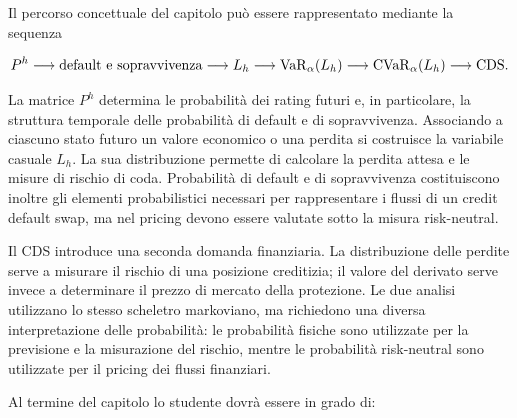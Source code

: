 Il percorso concettuale del capitolo pu\`{o} essere rappresentato
mediante la sequenza

\[
P^h
\longrightarrow
\text{default e sopravvivenza}
\longrightarrow
L_h
\longrightarrow
\operatorname{VaR}_{\alpha}(L_h)
\longrightarrow
\operatorname{CVaR}_{\alpha}(L_h)
\longrightarrow
\text{CDS}.
\]

La matrice $P^h$ determina le probabilit\`{a} dei rating futuri e,
in particolare, la struttura temporale delle probabilit\`{a} di
default e di sopravvivenza. Associando a ciascuno stato futuro un
valore economico o una perdita si costruisce la variabile casuale
$L_h$. La sua distribuzione permette di calcolare la perdita attesa
e le misure di rischio di coda. Probabilit\`{a} di default e di
sopravvivenza costituiscono inoltre gli elementi probabilistici
necessari per rappresentare i flussi di un credit default swap,
ma nel pricing devono essere valutate sotto la misura risk-neutral.

Il CDS introduce una seconda domanda finanziaria. La distribuzione
delle perdite serve a misurare il rischio di una posizione creditizia;
il valore del derivato serve invece a determinare il prezzo di mercato
della protezione. Le due analisi utilizzano lo stesso scheletro
markoviano, ma richiedono una diversa interpretazione delle
probabilit\`{a}: le probabilit\`{a} fisiche sono utilizzate per la
previsione e la misurazione del rischio, mentre le probabilit\`{a}
risk-neutral sono utilizzate per il pricing dei flussi finanziari.

Al termine del capitolo lo studente dovr\`{a} essere in grado di:

